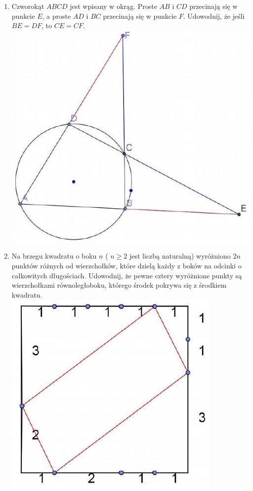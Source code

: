\documentclass[10pt]{article}
\begin{document}
\begin{enumerate}
  \item Czworokąt \(A B C D\) jest wpisany w okrąg. Proste \(A B\) i \(C D\) przecinają się w punkcie \(E\), a proste \(A D\) i \(B C\) przecinają się w punkcie \(F\). Udowodnij, że jeśli \(B E=D F\), to \(C E=C F\).\\
\includegraphics[max width=\textwidth, center]{2024_11_21_da23055957b186aca865g-1(1)}
  \item Na brzegu kwadratu o boku \(n\) ( \(n \geq 2\) jest liczbą naturalną) wyróżniono \(2 n\) punktów różnych od wierzchołków, które dzielą każdy z boków na odcinki o całkowitych długościach. Udowodnij, że pewne cztery wyróżnione punkty są wierzchołkami równoległoboku, którego środek pokrywa się z środkiem kwadratu.\\
\includegraphics[max width=\textwidth, center]{2024_11_21_da23055957b186aca865g-1(2)}

\end{enumerate}
\end{document}
